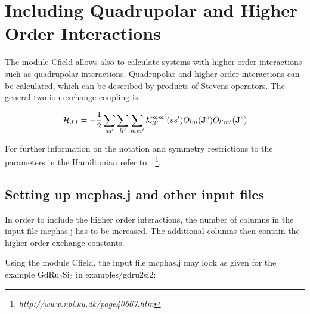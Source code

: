\section{Including Quadrupolar and Higher Order Interactions}
\label{qint}


The module {\prg Cfield} allows also to calculate systems with higher order interactions such
as quadrupolar interactions. Quadrupolar and higher order interactions can be calculated, which
can be described by products of Stevens operators. The general two ion exchange coupling is

\begin{equation}
\label{multipolehamiltonrepeated}
 {\mathcal H}_{JJ}=
             -\frac{1}{2}  \sum_{ss'} \sum_ {ll'} \sum_{mm'}
     {\mathcal K}_{ll'}^{mm'}(ss') O_{lm}({\mathbf J}^s) O_{l'm'}({\mathbf J}^s)
\end{equation}

For further information on the notation and symmetry restrictions to the
parameters in the Hamiltonian refer to~\cite{jensen91-1}~\footnote{\em http://www.nbi.ku.dk/page40667.htm}.


\subsection{Setting up {\prg mcphas.j} and other input files}

In order to include the higher order interactions, the number of columns in the input file
{\prg mcphas.j} has to be increased. The additional columns then contain the higher order
exchange constants.

Using the module {\prg Cfield}, the input file {\prg mcphas.j} may look as given for the 
example GdRu$_2$Si$_2$ in {\prg examples/gdru2si2}:

